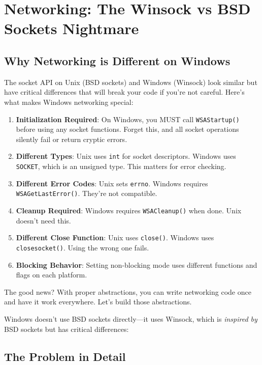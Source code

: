 \section{Networking: The Winsock vs BSD Sockets Nightmare}

\subsection{Why Networking is Different on Windows}

The socket API on Unix (BSD sockets) and Windows (Winsock) look similar but have critical differences that will break your code if you're not careful. Here's what makes Windows networking special:

\begin{enumerate}
    \item \textbf{Initialization Required}: On Windows, you MUST call \texttt{WSAStartup()} before using any socket functions. Forget this, and all socket operations silently fail or return cryptic errors.

    \item \textbf{Different Types}: Unix uses \texttt{int} for socket descriptors. Windows uses \texttt{SOCKET}, which is an unsigned type. This matters for error checking.

    \item \textbf{Different Error Codes}: Unix sets \texttt{errno}. Windows requires \texttt{WSAGetLastError()}. They're not compatible.

    \item \textbf{Cleanup Required}: Windows requires \texttt{WSACleanup()} when done. Unix doesn't need this.

    \item \textbf{Different Close Function}: Unix uses \texttt{close()}. Windows uses \texttt{closesocket()}. Using the wrong one fails.

    \item \textbf{Blocking Behavior}: Setting non-blocking mode uses different functions and flags on each platform.
\end{enumerate}

The good news? With proper abstractions, you can write networking code once and have it work everywhere. Let's build those abstractions.

Windows doesn't use BSD sockets directly—it uses Winsock, which is \textit{inspired by} BSD sockets but has critical differences:


\subsection{The Problem in Detail}

